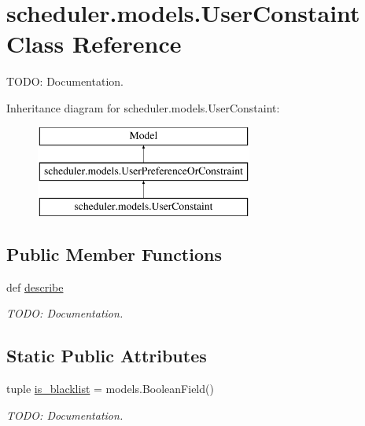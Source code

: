 \hypertarget{classscheduler_1_1models_1_1_user_constaint}{\section{scheduler.\-models.\-User\-Constaint Class Reference}
\label{classscheduler_1_1models_1_1_user_constaint}
}


T\-O\-D\-O\-: Documentation.  


Inheritance diagram for scheduler.\-models.\-User\-Constaint\-:\begin{figure}[H]
\begin{center}
\leavevmode
\includegraphics[height=3.000000cm]{classscheduler_1_1models_1_1_user_constaint}
\end{center}
\end{figure}
\subsection*{Public Member Functions}
\begin{DoxyCompactItemize}
\item 
\hypertarget{classscheduler_1_1models_1_1_user_constaint_a5a35e3eb2cd241453f4c1fbadb3c8812}{def \hyperlink{classscheduler_1_1models_1_1_user_constaint_a5a35e3eb2cd241453f4c1fbadb3c8812}{describe}}\label{classscheduler_1_1models_1_1_user_constaint_a5a35e3eb2cd241453f4c1fbadb3c8812}

\begin{DoxyCompactList}\small\item\em T\-O\-D\-O\-: Documentation. \end{DoxyCompactList}\end{DoxyCompactItemize}
\subsection*{Static Public Attributes}
\begin{DoxyCompactItemize}
\item 
\hypertarget{classscheduler_1_1models_1_1_user_constaint_a8817f2145d653131ad7084ad6ed71e97}{tuple \hyperlink{classscheduler_1_1models_1_1_user_constaint_a8817f2145d653131ad7084ad6ed71e97}{is\-\_\-blacklist} = models.\-Boolean\-Field()}\label{classscheduler_1_1models_1_1_user_constaint_a8817f2145d653131ad7084ad6ed71e97}

\begin{DoxyCompactList}\small\item\em T\-O\-D\-O\-: Documentation. \end{DoxyCompactList}\end{DoxyCompactItemize}


